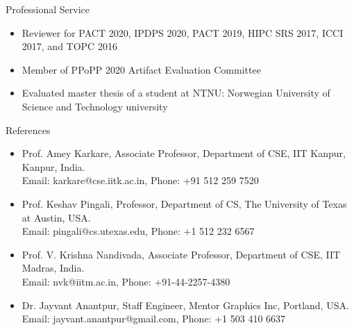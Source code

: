 \documentclass{resume} %
\begin{document}
\begin{rSection}{Professional Service}

\begin{itemize}
\item Reviewer for PACT 2020, IPDPS 2020, PACT 2019, HIPC SRS 2017, ICCI 2017, and TOPC 2016
\item Member of PPoPP 2020 Artifact Evaluation Committee
\item Evaluated master thesis of a student at NTNU: Norwegian University of Science and Technology university
\end{itemize}

\end{rSection}




\begin{rSection}{References}

\begin{itemize}
\item Prof. Amey Karkare, Associate Professor, Department of CSE, IIT Kanpur, Kanpur, India. \\
Email: karkare@cse.iitk.ac.in, Phone: +91 512 259 7520
\item Prof. Keshav Pingali, Professor, Department of CS, The University of Texas at Austin, USA. \\
Email: pingali@cs.utexas.edu, Phone: +1 512 232 6567
\item Prof. V. Krishna Nandivada, Associate Professor, Department of CSE, IIT Madras, India. \\
Email: nvk@iitm.ac.in, Phone:  +91-44-2257-4380
\item Dr. Jayvant Anantpur, Staff Engineer, Mentor Graphics Inc, Portland, USA. \\
Email: jayvant.anantpur@gmail.com, Phone: +1 503 410 6637
\end{itemize}

\end{rSection}

\pagebreak
\end{document}
